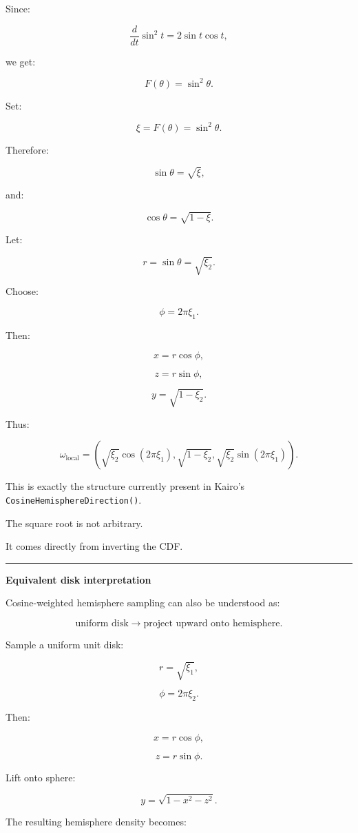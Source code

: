 Since:

\[
\frac{d}{dt}\sin^2t
=
2\sin t\cos t,
\]

we get:

\[
\boxed{
F(\theta)
=
\sin^2\theta.
}
\]

Set:

\[
\xi=F(\theta)
=
\sin^2\theta.
\]

Therefore:

\[
\sin\theta
=
\sqrt{\xi},
\]

and:

\[
\cos\theta
=
\sqrt{1-\xi}.
\]

Let:

\[
r=\sin\theta=\sqrt{\xi_2}.
\]

Choose:

\[
\phi=2\pi\xi_1.
\]

Then:

\[
x=r\cos\phi,
\]

\[
z=r\sin\phi,
\]

\[
y=\sqrt{1-\xi_2}.
\]

Thus:

\[
\boxed{
\omega_{\text{local}}
=
\left(
\sqrt{\xi_2}\cos(2\pi\xi_1),
\sqrt{1-\xi_2},
\sqrt{\xi_2}\sin(2\pi\xi_1)
\right).
}
\]

This is exactly the structure currently present in Kairo's \texttt{CosineHemisphereDirection()}.

The square root is not arbitrary.

It comes directly from inverting the CDF.

\begin{center}\rule{0.5\linewidth}{0.5pt}\end{center}

\textbf{Equivalent disk interpretation}

Cosine-weighted hemisphere sampling can also be understood as:

\[
\text{uniform disk}
\rightarrow
\text{project upward onto hemisphere}.
\]

Sample a uniform unit disk:

\[
r=\sqrt{\xi_1},
\]

\[
\phi=2\pi\xi_2.
\]

Then:

\[
x=r\cos\phi,
\]

\[
z=r\sin\phi.
\]

Lift onto sphere:

\[
y=\sqrt{1-x^2-z^2}.
\]

The resulting hemisphere density becomes:

